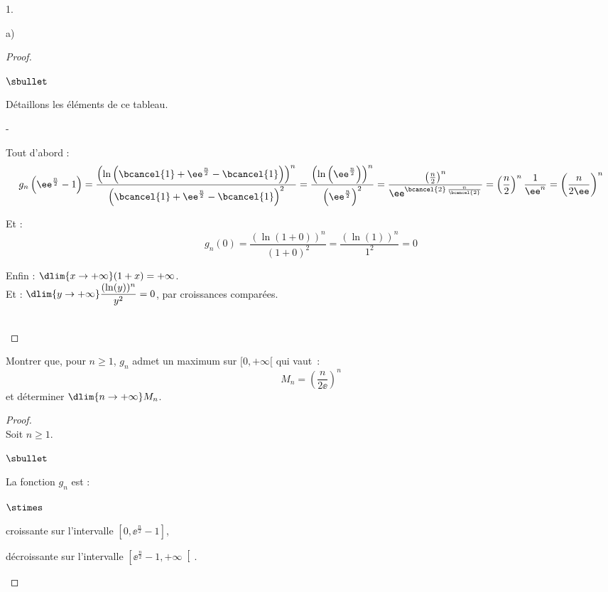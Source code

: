 \documentclass[11pt]{article}%
\begin{document}
\begin{noliste}{1.}
\begin{noliste}{a)}
\begin{proof}
\begin{noliste}{$\sbullet$}
   \item Détaillons les éléments de ce tableau.
     \begin{noliste}{-}
     \item Tout d'abord : 
       \[
       g_n\left(\ee^{\frac{n}{2}}-1\right) =
       \dfrac{\left(\ln\left(\bcancel{1} +
             \ee^{\frac{n}{2}}-\bcancel{1}\right)\right)^n}
       {\left(\bcancel{1}+\ee^{\frac{n}{2}}-\bcancel{1}\right)^2} =
       \dfrac{\left(\ln\left(\ee^{\frac{n}{2}} \right)\right)^n}
       {\left(\ee^{\frac{n}{2}}\right)^2} =
       \dfrac{\left(\frac{n}{2}\right)^n}{\ee^{\bcancel{2}\,
           \frac{n}{\bcancel{2}}}} = \left(\dfrac{n}{2}\right)^n
       \dfrac{1}{\ee^n} =\left(\dfrac{n}{2\ee}\right)^n
       \]
       
    
    
    
    \item Et :
    \[
     g_n(0) = \dfrac{\left(\ln(1+0)\right)^n}{(1+0)^2}
     = \dfrac{\left(\ln(1)\right)^n}{1^2}=0
    \]
    
  \item Enfin : $\dlim{x\to+\infty} (1+x)=+\infty$.\\[.2cm]
    Et : $\dlim{y\to +\infty} \dfrac{(\ln(y))^n}{y^2}=0$, par
    croissances comparées. %
  \end{noliste}
 \end{noliste}
 ~\\[-1.4cm]
\end{proof}


\item Montrer que, pour $n \geq 1$, $g_n$ admet un maximum sur 
$[0,+\infty[$ qui vaut~:
\[ 
M_n = \left( \dfrac{n}{2 \ee} \right)^n 
\]
et déterminer $\dlim{n \to + \infty} M_n$.

\begin{proof}~\\
 Soit $n\geq 1$.
 \begin{noliste}{$\sbullet$}
  \item La fonction $g_n$ est :
  \begin{noliste}{$\stimes$}
    \item croissante sur l'intervalle $\left[0, \ee^{\frac{n}{2}}-1
    \right]$,
    \item décroissante sur l'intervalle $\left[ \ee^{\frac{n}{2}} -1,
    +\infty \right[$.
  \end{noliste}
  \conc{Sur $[0,+\infty[$, La fonction $g_n$ admet un maximum $M_n$ en 
  $\ee^{\frac{n}{2}}-1$ et,\\[.2cm]
  d'après la question \itbf{1.b)}, $M_n=\left(\dfrac{n}{2\ee}\right)^n$}
  

\end{noliste}
\end{proof}
\end{noliste}
\end{noliste}
\end{document}
